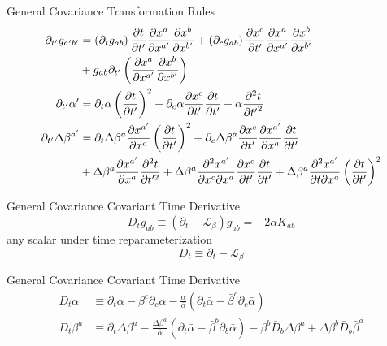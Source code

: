 \documentclass[xcolor=dvipsnames]{beamer}
\begin{document}
	\begin{frame}{General Covariance}
		Transformation Rules
		\begin{align*}
			\partial_{t'}g_{a'b'} &=  \left(\partial_{t}g_{ab}\right)\frac{\partial t}{\partial t'}\frac{\partial x^{a}}{\partial x^{a'}}\frac{\partial x^{b}}{\partial x^{b'}} + \left(\partial_{c}g_{ab}\right)\frac{\partial x^{c}}{\partial t'}\frac{\partial x^{a}}{\partial x^{a'}}\frac{\partial x^{b}}{\partial x^{b'}} \\
			&+ g_{ab}\partial_{t'}\left(\frac{\partial x^{a}}{\partial x^{a'}}\frac{\partial x^{b}}{\partial x^{b'}}\right)\\
			\partial_{t'}\alpha' &= \partial_{t}\alpha\left(\frac{\partial t}{\partial t'}\right)^{2} + \partial_{c}\alpha\frac{\partial x^{c}}{\partial t'}\frac{\partial t}{\partial t'} + \alpha\frac{\partial^{2}t}{\partial {t'}^{2}}\\
			\partial_{t'}\Delta \beta^{a'} &= \partial_{t}\Delta \beta^{a}\frac{\partial x^{a'}}{\partial x^{a}}\left(\frac{\partial t}{\partial t'}\right)^{2} + \partial_{c}\Delta \beta^{a}\frac{\partial x^{c}}{\partial t'}\frac{\partial x^{a'}}{\partial x^{a}}\frac{\partial t}{\partial t'}\notag\\
			& + \Delta \beta^{a}\frac{\partial x^{a'}}{\partial x^{a}}\frac{\partial^{2}t}{\partial t'^{2}} + \Delta \beta^{a}\frac{\partial^{2} x^{a'}}{\partial x^{c}\partial x^{a}}\frac{\partial x^{c}}{\partial t'}\frac{\partial t}{\partial t'} + \Delta \beta^{a}\frac{\partial^{2}x^{a'}}{\partial t\partial x^{a}}\left(\frac{\partial t}{\partial t'}\right)^{2}
		\end{align*}
	\end{frame}
	\begin{frame}{General Covariance}
		Covariant Time Derivative
		\[
			D_{t}g_{ab} \equiv (\partial_{t} - \mathcal{L}_{\beta})g_{ab} = -2\alpha K_{ab}
		\]
		\pause
		any scalar under time reparameterization
		\[
			D_{t} \equiv \partial_{t} - \mathcal{L}_{\beta} 
		\]		
	\end{frame}
	\begin{frame}{General Covariance}
		Covariant Time Derivative
		\begin{align*}
		D_{t}\alpha &\equiv \partial_{t}\alpha - \beta^{c}\partial_{c}\alpha - \frac{\alpha}{{\bar \alpha}}\left(\partial_{t}{\bar \alpha} - {\bar \beta}^{c}\partial_{c}{\bar \alpha}\right)\\
		D_{t}\beta^{a} &\equiv \partial_{t}\Delta \beta^{a} - \frac{\Delta \beta^{a}}{{\bar \alpha}}\left(\partial_{t}{\bar \alpha} - {\bar \beta}^{b}\partial_{b}{\bar \alpha}\right) - \beta^{b}{\bar D}_{b}\Delta \beta^{a} + \Delta \beta^{b}{\bar D}_{b}{\bar \beta}^{a}
		\end{align*}
	\end{frame}
\end{document}
